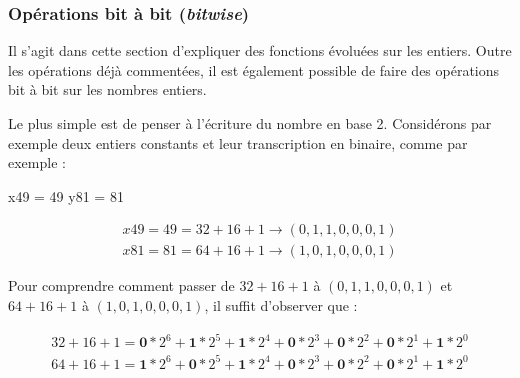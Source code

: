 \subsubsection[Opérations bit à bit (\textit{bitwise})]{Opérations bit à bit (\textit{bitwise})}
\label{subsub:X.3.2.2}

Il s'agit dans cette section d'expliquer des fonctions évoluées sur les entiers. 
Outre les opérations déjà commentées, il est également possible de faire des opérations bit à bit sur les nombres entiers. 

Le plus simple est de penser à l'écriture du nombre en base 2.
Considérons par exemple deux entiers constants et leur transcription en binaire, comme par exemple :

\begin{idleconsole}[after skip=6pt]
	\begin{pyconsole}
		x49 = 49
		y81 = 81
	\end{pyconsole}
\end{idleconsole}

\begin{equation}
\begin{aligned}
x49 = 49 = 32 + 16 + 1 \rightarrow (0, 1, 1, 0, 0, 0, 1) \\
x81 = 81 = 64 + 16 + 1 \rightarrow (1, 0, 1, 0, 0, 0, 1)
\end{aligned}
\end{equation}
\vspace{-0.75\baselineskip}

Pour comprendre comment passer de $32 + 16 + 1$ à $(0, 1, 1, 0, 0, 0, 1)$ et $64 + 16 + 1$ à $(1, 0, 1, 0, 0, 0, 1)$, il suffit d'observer que :

\vspace{-1.25\baselineskip}
\begin{equation}
\begin{aligned}
32 + 16 + 1 = \mathbf{0}*2^6 + \mathbf{1}*2^5 + \mathbf{1}*2^4 + \mathbf{0}*2^3 + \mathbf{0}*2^2 + \mathbf{0}*2^1 +\mathbf{1}*2^0 \\
64 + 16 + 1 = \mathbf{1}*2^6 + \mathbf{0}*2^5 + \mathbf{1}*2^4 + \mathbf{0}*2^3 + \mathbf{0}*2^2 + \mathbf{0}*2^1 + \mathbf{1}*2^0 
\end{aligned}
\end{equation}
\vspace{-0.75\baselineskip}


